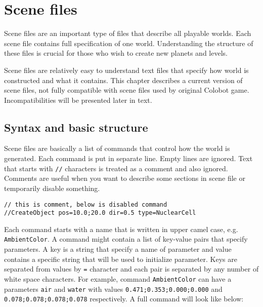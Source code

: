 
\section{Scene files}

Scene files are an important type of files that describe all playable worlds. Each scene file contains full specification of one world. Understanding the structure of these files is crucial for those who wish to create new planets and levels.

Scene files are relatively easy to understand text files that specify how world is constructed and what it contains. This chapter describes a current version of scene files, not fully compatible with scene files used by original Colobot game. Incompatibilities will be presented later in text.


\subsection{Syntax and basic structure}


Scene files are basically a list of commands that control how the world is generated. Each command is put in separate line. Empty lines are ignored. Text that starts with \texttt{//} characters is treated as a comment and also ignored. Comments are useful when you want to describe some sections in scene file or temporarily disable something.

\begin{verbatim}
// this is comment, below is disabled command
//CreateObject pos=10.0;20.0 dir=0.5 type=NuclearCell
\end{verbatim}

Each command starts with a name that is written in upper camel case, e.g. \texttt{AmbientColor}. A command might contain a list of key-value pairs that specify parameters. A key is a string that specify a name of parameter and value contains a specific string that will be used to initialize parameter. Keys are separated from values by \texttt{=} character and each pair is separated by any number of white space characters. For example, command \texttt{AmbientColor} can have a parameters \texttt{air} and \texttt{water} with values \texttt{0.471;0.353;0.000;0.000} and \texttt{0.078;0.078;0.078;0.078} respectively. A full command will look like below:

